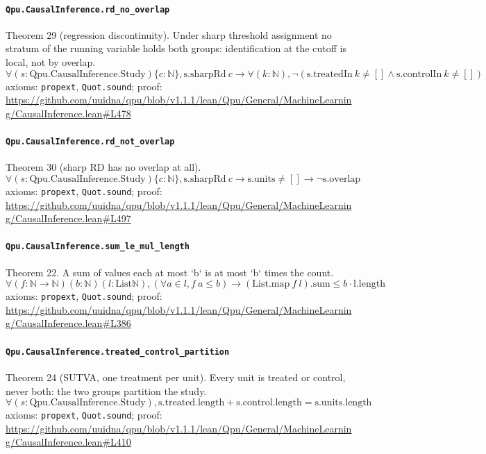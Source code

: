 \documentclass[11pt]{article}
\begin{document}
\paragraph{\texttt{Qpu.CausalInference.rd\_no\_overlap}}
Theorem 29 (regression discontinuity). Under sharp threshold assignment no stratum of the running variable holds both groups: identification at the cutoff is local, not by overlap.
\[ \forall (s : \mathrm{Qpu.CausalInference.Study}) \{c : \mathbb{N}\}, \mathrm{s.sharpRd}\ c \to \forall (k : \mathbb{N}), \neg (\mathrm{s.treatedIn}\ k \ne [] \land \mathrm{s.controlIn}\ k \ne []) \]
\noindent axioms: \texttt{propext}, \texttt{Quot.sound}; proof: \url{https://github.com/uuidna/qpu/blob/v1.1.1/lean/Qpu/General/MachineLearning/CausalInference.lean\#L478}

\paragraph{\texttt{Qpu.CausalInference.rd\_not\_overlap}}
Theorem 30 (sharp RD has no overlap at all).
\[ \forall (s : \mathrm{Qpu.CausalInference.Study}) \{c : \mathbb{N}\}, \mathrm{s.sharpRd}\ c \to \mathrm{s.units} \ne [] \to \neg \mathrm{s.overlap} \]
\noindent axioms: \texttt{propext}, \texttt{Quot.sound}; proof: \url{https://github.com/uuidna/qpu/blob/v1.1.1/lean/Qpu/General/MachineLearning/CausalInference.lean\#L497}

\paragraph{\texttt{Qpu.CausalInference.sum\_le\_mul\_length}}
Theorem 22. A sum of values each at most `b` is at most `b` times the count.
\[ \forall (f : \mathbb{N} \to \mathbb{N}) (b : \mathbb{N}) (l : \mathrm{List} \mathbb{N}), (\forall a \in l, f\ a \le b) \to (\mathrm{List.map}\ f\ l)\mathrm{.sum} \le b \cdot \mathrm{l.length} \]
\noindent axioms: \texttt{propext}, \texttt{Quot.sound}; proof: \url{https://github.com/uuidna/qpu/blob/v1.1.1/lean/Qpu/General/MachineLearning/CausalInference.lean\#L386}

\paragraph{\texttt{Qpu.CausalInference.treated\_control\_partition}}
Theorem 24 (SUTVA, one treatment per unit). Every unit is treated or control, never both: the two groups partition the study.
\[ \forall (s : \mathrm{Qpu.CausalInference.Study}), \mathrm{s.treated.length} + \mathrm{s.control.length} = \mathrm{s.units.length} \]
\noindent axioms: \texttt{propext}, \texttt{Quot.sound}; proof: \url{https://github.com/uuidna/qpu/blob/v1.1.1/lean/Qpu/General/MachineLearning/CausalInference.lean\#L410}
\end{document}
